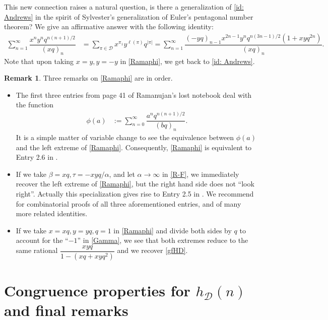 \documentclass[12pt]{amsart}
\numberwithin{equation}{section}
\theoremstyle{plain}
\theoremstyle{definition}
\newtheorem{remark}[theorem]{Remark}
\def\D{\mathcal{D}}
\begin{document}
This new connection raises a natural question, is there a generalization of \eqref{id: Andrews} in the spirit of Sylvester's generalization \cite[(3.3)]{Andr3} of Euler's pentagonal number theorem? We give an affirmative answer with the following identity:
\begin{align}\label{Ramaphi}
\sum\limits_{n=1}^{\infty}\dfrac{x^ny^nq^{n(n+1)/2}}{(xq)_n}&=
\sum\limits_{\pi\in\D}x^{\pi_1}y^{\ell(\pi)}q^{|\pi|}=
\sum\limits_{n=1}^{\infty}\dfrac{(-yq)_{n-1}x^{2n-1}y^nq^{n(3n-1)/2}(1+xyq^{2n})}{(xq)_{n}}.
\end{align}
Note that upon taking $x=y, y=-y$ in \eqref{Ramaphi}, we get back to \eqref{id: Andrews}.
\begin{remark}
Three remarks on \eqref{Ramaphi} are in order.
\begin{itemize}
\item The first three entries from page 41 of Ramanujan's lost notebook \cite{Rama} deal with the function
\begin{align*}
\phi(a)&:=\sum_{n=0}^{\infty}\dfrac{a^nq^{n(n+1)/2}}{(bq)_n}.
\end{align*}
It is a simple matter of variable change to see the equivalence between $\phi(a)$ and the left extreme of \eqref{Ramaphi}. Consequently, \eqref{Ramaphi} is equivalent to Entry 2.6 in \cite{Rama}.
\item If we take $\beta=xq, \tau=-xyq/\alpha$, and let $\alpha\rightarrow \infty$ in \eqref{R-F}, we immediately recover the left extreme of \eqref{Ramaphi}, but the right hand side does not ``look right''. Actually this specialization gives rise to Entry 2.5 in \cite{Rama}. We recommend \cite{BY} for combinatorial proofs of all three aforementioned entries, and of many more related identities.
\item If we take $x=xq,y=yq,q=1$ in \eqref{Ramaphi} and divide both sides by $q$ to account for the ``$-1$'' in \eqref{Gamma}, we see that both extremes reduce to the same rational $\dfrac{xyq}{1-(xq+xyq^2)}$ and we recover \eqref{gfHD}.
\end{itemize}
\end{remark}




\section{Congruence properties for $h_{\D}(n)$ and final remarks}\label{sec:cong}
\end{document}
